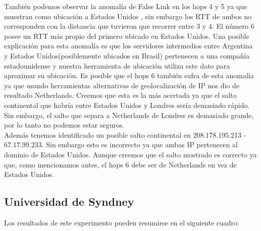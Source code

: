 También podemos observar la anomalía de False Link en los hops 4 y 5 ya que muestran como ubicación a Estados Unidos
, sin embargo los RTT de ambos no corresponden con la distancia que tuvieron que recorrer entre 3 y 4. El número 6
posee un RTT más propio del primero ubicado en Estados Unidos. Una posible explicación para esta anomalía es que
los servidores intermedios entre Argentina y Estados Unidos(posiblemente ubicados en Brasil) pertenecen a una
compañía estadounidense y nuestra herramienta de ubicación utiliza este dato para aproximar su ubicación. Es posible
que el hops 6 también sufra de esta anomalía ya que usando herramientas alternativas de geolocalización de IP nos dio
de resultado Netherlands. Creemos que esta es la más acertada ya que el salto continental que habría entre
Estados Unidos y Londres sería demasiado rápido. Sin embargo, el salto que separa a Netherlands de
Londres es demasiado grande, por lo tanto no podemos estar seguros.\\

Además tenemos identificado un posible salto continental en 208.178.195.213 - 67.17.99.233.
Sin embargo esto es incorrecto ya que ambas IP pertenecen al dominio de Estados Unidos. Aunque creemos que
el salto mostrado es correcto ya que, como mencionamos antes, el hops 6 debe ser de Netherlands en
vez de Estados Unidos.

\newpage

\subsection{Universidad de Syndney}

Los resultados de este experimento pueden resumirse en el siguiente cuadro:

